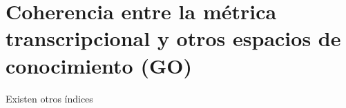 \chapter{Coherencia entre la métrica transcripcional y otros espacios de conocimiento (GO)}
Existen otros índices 